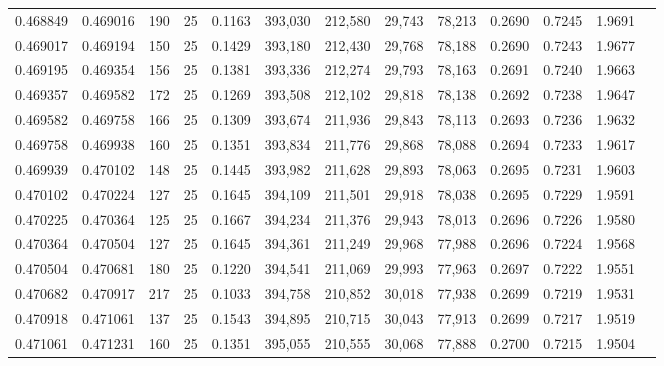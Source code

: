 \begin{tabular}{rrrrrrrrrrrrr}
0.468849 & 0.469016 &   190 &  25 &                                     0.1163 & 393,030 & 212,580 &  29,743 &  78,213 & 0.2690 & 0.7245 & 1.9691 \\
0.469017 & 0.469194 &   150 &  25 &                                     0.1429 & 393,180 & 212,430 &  29,768 &  78,188 & 0.2690 & 0.7243 & 1.9677 \\
0.469195 & 0.469354 &   156 &  25 &                                     0.1381 & 393,336 & 212,274 &  29,793 &  78,163 & 0.2691 & 0.7240 & 1.9663 \\
0.469357 & 0.469582 &   172 &  25 &                                     0.1269 & 393,508 & 212,102 &  29,818 &  78,138 & 0.2692 & 0.7238 & 1.9647 \\
0.469582 & 0.469758 &   166 &  25 &                                     0.1309 & 393,674 & 211,936 &  29,843 &  78,113 & 0.2693 & 0.7236 & 1.9632 \\
0.469758 & 0.469938 &   160 &  25 &                                     0.1351 & 393,834 & 211,776 &  29,868 &  78,088 & 0.2694 & 0.7233 & 1.9617 \\
0.469939 & 0.470102 &   148 &  25 &                                     0.1445 & 393,982 & 211,628 &  29,893 &  78,063 & 0.2695 & 0.7231 & 1.9603 \\
0.470102 & 0.470224 &   127 &  25 &                                     0.1645 & 394,109 & 211,501 &  29,918 &  78,038 & 0.2695 & 0.7229 & 1.9591 \\
0.470225 & 0.470364 &   125 &  25 &                                     0.1667 & 394,234 & 211,376 &  29,943 &  78,013 & 0.2696 & 0.7226 & 1.9580 \\
0.470364 & 0.470504 &   127 &  25 &                                     0.1645 & 394,361 & 211,249 &  29,968 &  77,988 & 0.2696 & 0.7224 & 1.9568 \\
0.470504 & 0.470681 &   180 &  25 &                                     0.1220 & 394,541 & 211,069 &  29,993 &  77,963 & 0.2697 & 0.7222 & 1.9551 \\
0.470682 & 0.470917 &   217 &  25 &                                     0.1033 & 394,758 & 210,852 &  30,018 &  77,938 & 0.2699 & 0.7219 & 1.9531 \\
0.470918 & 0.471061 &   137 &  25 &                                     0.1543 & 394,895 & 210,715 &  30,043 &  77,913 & 0.2699 & 0.7217 & 1.9519 \\
0.471061 & 0.471231 &   160 &  25 &                                     0.1351 & 395,055 & 210,555 &  30,068 &  77,888 & 0.2700 & 0.7215 & 1.9504 \\

\end{tabular}
